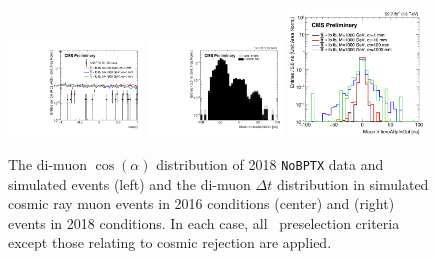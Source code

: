 \begin{figure}
\centering
\includegraphics[width=0.32\textwidth]{figures/selection/mumu_cos_alpha.pdf}
\includegraphics[width=0.32\textwidth]{figures/selection/cosmic_mc_delta_t.pdf}
\includegraphics[width=0.32\textwidth]{figures/selection/signal_mc_delta_t.png}
\caption{The di-muon $\cos{(\alpha)}$ distribution of 2018 \texttt{NoBPTX} data and simulated \stoptolb events (left) and the di-muon $\Delta t$ distribution in simulated cosmic ray muon events in 2016 conditions (center) and \stoptolb (right) events in 2018 conditions. In each case, all \Pgm\Pgm\ preselection criteria except those relating to cosmic rejection are applied.}
\label{cosmic_cut_distributions}
\end{figure}